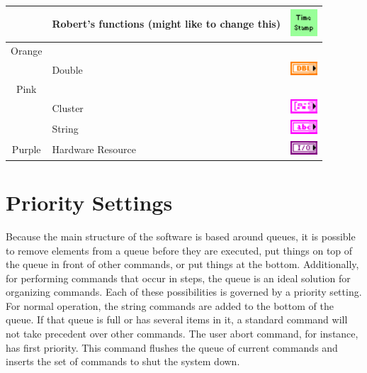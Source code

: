 \begin{table}[h]
\begin{tabular}{clc}
		& Robert's functions	(might like to change this) 	& \includegraphics[height=0.4in]{Figures/ColorCoding_Custom}			\\\hline
Orange	& 									& 															\\\hline
		& Double								& \includegraphics[height=0.2in]{Figures/ColorCoding_Float}				\\\hline
Pink		&									&															\\\hline
		& Cluster								& \includegraphics[height=0.2in]{Figures/ColorCoding_Cluster}				\\\hline
		& String								& \includegraphics[height=0.2in]{Figures/ColorCoding_String}				\\\hline
Purple	& Hardware Resource					& \includegraphics[height=0.2in]{Figures/ColorCoding_HardwareReference}	\\\hline
\end{tabular}
\label{Table:BPColorCoding}
\end{table}


\section{Priority Settings}
Because the main structure of the software is based around queues, it is possible to remove elements from a queue before they are executed, put things on top of the queue in front of other commands, or put things at the bottom. Additionally, for performing commands that occur in steps, the queue is an ideal solution for organizing commands. Each of these possibilities is governed by a priority setting. For normal operation, the string commands are added to the bottom of the queue. If that queue is full or has several items in it, a standard command will not take precedent over other commands. The user abort command, for instance, has first priority. This command flushes the queue of current commands and inserts the set of commands to shut the system down.



